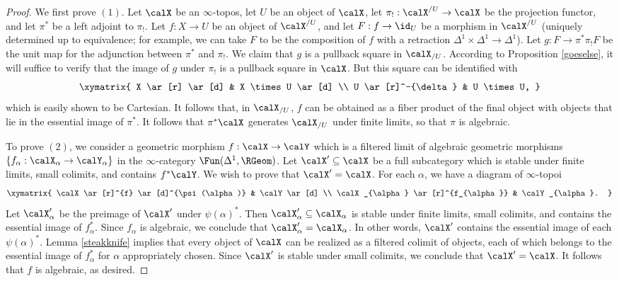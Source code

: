 \begin{proof}
We first prove $(1)$. Let $\calX$ be an $\infty$-topos, let $U$ be an object of $\calX$,
let $\pi_{!}: \calX^{/U} \rightarrow \calX$ be the projection functor, and let $\pi^{\ast}$ be a 
left adjoint to $\pi_{!}$. Let $f: X \rightarrow U$ be an object of $\calX^{/U}$, and let
$F: f \rightarrow \id_{U}$ be a morphism in $\calX^{/U}$ (uniquely determined up to equivalence; for example, we can take $F$ to be the composition of $f$ with a retraction $\Delta^1 \times \Delta^1 \rightarrow \Delta^1$). Let $g: F \rightarrow \pi^{\ast} \pi_{!} F$ be the unit map for the adjunction
between $\pi^{\ast}$ and $\pi_{!}$. We claim that $g$ is a pullback square in $\calX_{/U}$. According to Proposition \ref{goeselse}, it will suffice to verify that the image of $g$ under $\pi_{!}$ is a pullback square in $\calX$. But this square can be identified with
$$ \xymatrix{ X \ar[r] \ar[d] & X \times U \ar[d] \\
U \ar[r]^-{\delta} & U \times U, }$$
which is easily shown to be Cartesian. It follows that, in $\calX_{/U}$, $f$ can be obtained
as a fiber product of the final object with objects that lie in the essential image of $\pi^{\ast}$.
It follows that $\pi^{\ast} \calX$ generates $\calX_{/U}$ under finite limits, so that
$\pi$ is algebraic.

To prove $(2)$, we consider a geometric morphism $f: \calX \rightarrow \calY$ which
is a filtered limit of algebraic geometric morphisms $\{ f_{\alpha}: \calX_{\alpha} \rightarrow \calY_{\alpha} \}$ in the $\infty$-category $\Fun(\Delta^1, \RGeom)$. Let $\calX' \subseteq \calX$
be a full subcategory which is stable under finite limits, small colimits, and contains
$f^{\ast} \calY$. We wish to prove that $\calX' = \calX$. For each $\alpha$, we have
a diagram of $\infty$-topoi
$$ \xymatrix{ \calX \ar[r]^{f} \ar[d]^{\psi(\alpha)} & \calY \ar[d] \\
\calX_{\alpha} \ar[r]^{f_{\alpha}} & \calY_{\alpha}. }$$
Let $\calX'_{\alpha}$ be the preimage of $\calX'$ under $\psi(\alpha)^{\ast}$. Then
$\calX'_{\alpha} \subseteq \calX_{\alpha}$ is stable under finite limits, small colimits, and
contains the essential image of $f_{\alpha}^{\ast}$. Since $f_{\alpha}$ is algebraic, we conclude
that $\calX'_{\alpha} = \calX_{\alpha}$. In other words, $\calX'$ contains the essential image
of each $\psi(\alpha)^{\ast}$. Lemma \ref{steakknife} implies that every object of $\calX$ can be realized as a filtered colimit of objects, each of which belongs to the essential image of
$f_{\alpha}^{\ast}$ for $\alpha$ appropriately chosen. Since $\calX'$ is stable under small colimits, we conclude that $\calX' = \calX$. It follows that $f$ is algebraic, as desired.
\end{proof}

